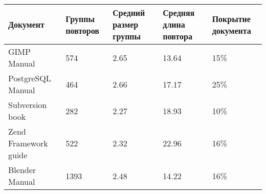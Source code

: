 \begin{minipage}{0.9\textwidth}
\begin{adjustbox}{center}
\begin{tabular}{|l||m{}|m{}|m{}|m{}|}
	\hline
	Документ & Группы повторов & Средний размер группы & Средняя длина повтора & Покрытие документа \\
	\hline
	\hline
	GIMP Manual & 574 & 2.65 & 13.64 & 15\% \\
	\hline
	PostgreSQL Manual & 464 & 2.66 & 17.17 & 25\% \\
	\hline
	Subversion book & 282 & 2.27 & 18.93 & 10\% \\
	\hline
	Zend Framework guide & 522 & 2.32 & 22.96 & 16\% \\
	\hline
	Blender Manual & 1393 & 2.48 & 14.22 & 16\% \\
	\hline
\end{tabular}
\end{adjustbox}
\end{minipage}